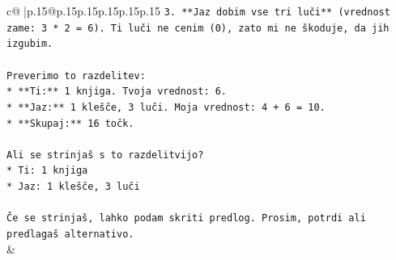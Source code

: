 \documentclass{article}
\begin{document}
{\begin{supertabular}{c@{$\;$}|p{.15\linewidth}@{}p{.15\linewidth}p{.15\linewidth}p{.15\linewidth}p{.15\linewidth}p{.15\linewidth}}
{{{\texttt{3.  **Jaz dobim vse tri luči** (vrednost zame: 3 * 2 = 6). Ti luči ne cenim (0), zato mi ne škoduje, da jih izgubim.} \\
\\ 
\texttt{Preverimo to razdelitev:} \\
\texttt{*   **Ti:** 1 knjiga. Tvoja vrednost: 6.} \\
\texttt{*   **Jaz:** 1 klešče, 3 luči. Moja vrednost: 4 + 6 = 10.} \\
\texttt{*   **Skupaj:** 16 točk.} \\
\\ 
\texttt{Ali se strinjaš s to razdelitvijo?} \\
\texttt{*   Ti: 1 knjiga} \\
\texttt{*   Jaz: 1 klešče, 3 luči} \\
\\ 
\texttt{Če se strinjaš, lahko podam skriti predlog. Prosim, potrdi ali predlagaš alternativo.} \\
            }
        }
    }
    & \\ \\


\end{supertabular}}
\end{document}

